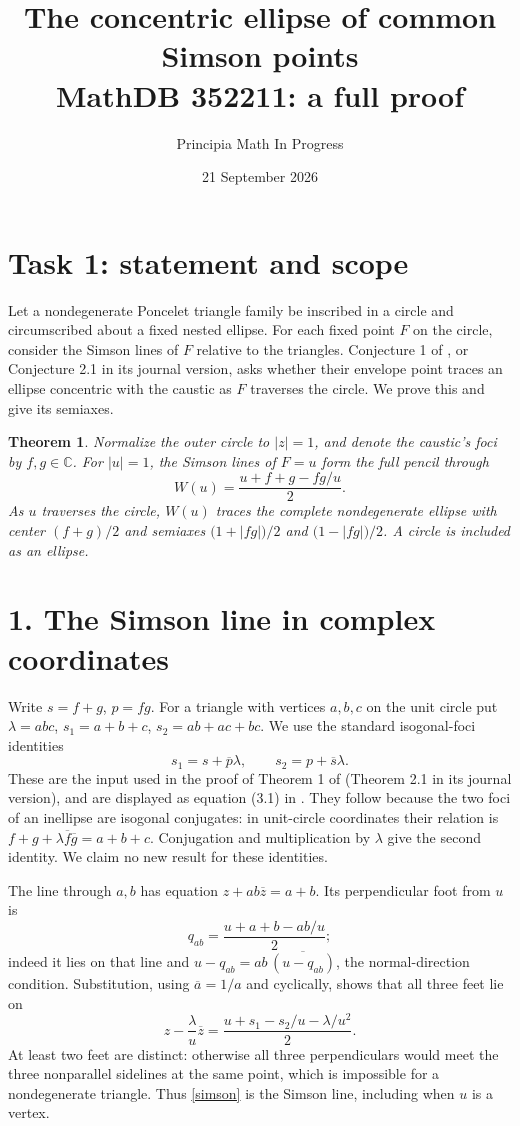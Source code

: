 \documentclass[11pt]{article}
\title{The concentric ellipse of common Simson points\\
\large MathDB 352211: a full proof}
\author{Principia Math In Progress}
\date{21 September 2026}
\newtheorem{theorem}{Theorem}
\newcommand{\C}{\mathbb C}
\newcommand{\bc}[1]{\overline{#1}}
\begin{document}
\maketitle
\section*{Task 1: statement and scope}
Let a nondegenerate Poncelet triangle family be inscribed in a circle and
circumscribed about a fixed nested ellipse. For each fixed point $F$ on the
circle, consider the Simson lines of $F$ relative to the triangles.
Conjecture 1 of \cite{RG}, or Conjecture 2.1 in its journal version, asks
whether their envelope point traces an ellipse concentric with the caustic
as $F$ traverses the circle. We prove this and give its semiaxes.

\begin{theorem}
Normalize the outer circle to $|z|=1$, and denote the caustic's foci by
$f,g\in\C$. For $|u|=1$, the Simson lines of $F=u$ form the full pencil
through
\[
             W(u)=\frac{u+f+g-fg/u}{2}.
\]
As $u$ traverses the circle, $W(u)$ traces the complete nondegenerate ellipse
with center $(f+g)/2$ and semiaxes
$\bigl(1+|fg|\bigr)/2$ and $\bigl(1-|fg|\bigr)/2$.
A circle is included as an ellipse.
\end{theorem}

\section*{1. The Simson line in complex coordinates}
Write $s=f+g$, $p=fg$. For a triangle with vertices $a,b,c$ on the unit
circle put $\lambda=abc$, $s_1=a+b+c$, $s_2=ab+ac+bc$.
We use the standard isogonal-foci identities
\begin{equation}\label{foci}
       s_1=s+\bc p\lambda,\qquad s_2=p+\bc s\lambda.
\end{equation}
These are the input used in the proof of Theorem 1 of \cite{RG}
(Theorem 2.1 in its journal version), and are displayed as equation (3.1)
in \cite{GG}. They follow because the two foci of an inellipse are
isogonal conjugates: in unit-circle coordinates their relation is
$f+g+\lambda\bc f\bc g=a+b+c$. Conjugation and multiplication by $\lambda$
give the second identity. We claim no new result for these identities.

The line through $a,b$ has equation $z+ab\bc z=a+b$. Its perpendicular
foot from $u$ is
\[
 q_{ab}=\frac{u+a+b-ab/u}{2};
\]
indeed it lies on that line and
$u-q_{ab}=ab\,\bc{(u-q_{ab})}$, the normal-direction condition.
Substitution, using $\bc a=1/a$ and cyclically, shows that all three
feet lie on
\begin{equation}\label{simson}
 z-\frac{\lambda}{u}\bc z
       =\frac{u+s_1-s_2/u-\lambda/u^2}{2}.
\end{equation}
At least two feet are distinct: otherwise all three perpendiculars would
meet the three nonparallel sidelines at the same point, which is
impossible for a nondegenerate triangle. Thus \eqref{simson} is the Simson
line, including when $u$ is a vertex.
\end{document}
